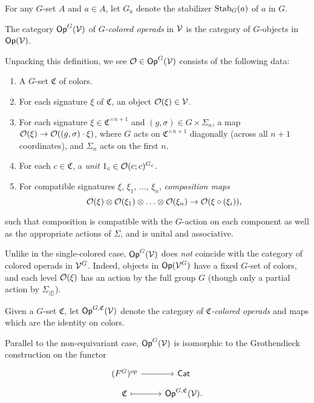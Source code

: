 \documentclass[a4paper,10pt
]{article}%
\renewcommand{\1}{\ensuremath{\mathbb{id}}}
\begin{document}
\begin{notation}
      For any $G$-set $A$ and $a \in A$, let $G_a$ denote the stabilizer $\mathrm{Stab}_G(a)$ of $a$ in $G$.
\end{notation}

\begin{definition}
      The category $\mathsf{Op}^G(\mathcal V)$ of  \textit{$G$-colored operads} in $\mathcal V$ is the category of
      $G$-objects in $\mathsf{Op}(\mathcal V)$.
\end{definition}

Unpacking this definition, we see $\mathcal{O} \in \mathsf{Op}^G(\mathcal V)$ consists of the following data:
\begin{enumerate}[label = (\arabic*)]
\item A $G$-set $\mathfrak C$ of colors.
\item For each signature $\xi$ of $\mathfrak C$, an object $\mathcal{O}(\xi) \in \mathcal V$.
\item For each signature $\xi \in \mathfrak C^{\times n+1}$ and $(g,\sigma) \in G\times \Sigma_n$, a map
      $\mathcal{O}(\xi) \to \mathcal{O}((g,\sigma)\cdot \xi)$,
      where $G$ acts on $\mathfrak C^{\times n+1}$ diagonally (across all $n+1$ coordinates), and $\Sigma_n$ acts on the first $n$.
\item For each $c \in \mathfrak C$, a \textit{unit} $1_c \in \mathcal{O}(c;c)^{G_c}$.
\item For compatible signatures $\xi$, $\xi_1$, $\ldots$, $\xi_n$, \textit{composition maps}
      \begin{equation}
            \mathcal{O}(\xi) \otimes \mathcal{O}(\xi_1) \otimes \ldots \otimes \mathcal{O}(\xi_n) \to \mathcal{O}(\xi \circ (\xi_i)),
      \end{equation}
\end{enumerate}
such that composition is
compatible with the $G$-action on each component as well as the appropriate actions of $\Sigma$,
and is unital and associative. 


\begin{remark}
	Unlike in the single-colored case, $\mathsf{Op}^G(\mathcal V)$ does \textit{not} coincide with the category of colored operads in $\mathcal V^G$.
	Indeed, objects in $\mathsf{Op}(\mathcal V^G)$ have a fixed $G$-set of colors,
        and each level $\mathcal{O}(\xi)$ has an action by the full group $G$
	(though only a partial action by $\Sigma_{|\xi|}$).
\end{remark}

\begin{definition}
      Given a $G$-set $\mathfrak C$, let $\mathsf{Op}^{G,\mathfrak C}(\mathcal V)$ denote the category of \textit{$\mathfrak C$-colored operads} and maps which are the identity on colors.
      
      Parallel to the non-equivariant case, $\mathsf{Op}^G(\mathcal V)$ is isomorphic to the Grothendieck construction on the functor
      \begin{equation}
            \begin{tikzcd}[row sep = tiny]
                  \mathsf (F^G)^{op} \arrow[r] & \mathsf{Cat}
                  \\
                  \mathfrak C \arrow[r, mapsto] & \Op^{G,\mathfrak C}(\V).
            \end{tikzcd}
      \end{equation}
\end{definition}
\end{document}
